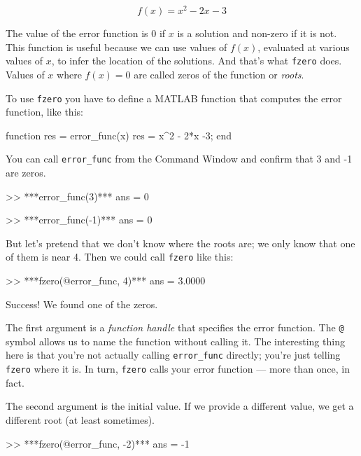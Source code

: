 \begin{equation}
f(x) = x^2 - 2x -3
\end{equation}

The value of the error function is 0 if $x$ is a solution and non-zero if it is not.
This function is useful because we can use values of $f(x)$, evaluated at various values of $x$, to infer the location of the solutions.  And that's what {\tt fzero} does.
Values of $x$ where $f(x) = 0$ are called zeros of the function or \emph{roots}.


To use {\tt fzero} you have to define a MATLAB function that computes the error function, like this:

\begin{code}
function res = error_func(x)
    res = x^2 - 2*x -3;
end
\end{code}

You can call \verb"error_func" from the Command Window and confirm that 3 and -1 are zeros.

\begin{code}
>> ***error_func(3)***
ans = 0

>> ***error_func(-1)***
ans = 0
\end{code}

But let's pretend that we don't know where the roots are; we only know that one of them is near 4.  Then we could call {\tt fzero} like this:

\begin{code}
>> ***fzero(@error_func, 4)***
ans = 3.0000
\end{code}

Success!  We found one of the zeros.

The first argument is a {\em function handle} that specifies
the error function.  The {\tt @} symbol allows us to name the
function without calling it.  The interesting thing here is
that you're not actually calling \verb"error_func" directly;
you're just telling {\tt fzero} where it is.  In turn, {\tt fzero}
calls your error function --- more than once, in fact.


The second argument is the initial value.  If we provide a different
value, we get a different root (at least sometimes).

\begin{code}
>> ***fzero(@error_func, -2)***
ans = -1
\end{code}

